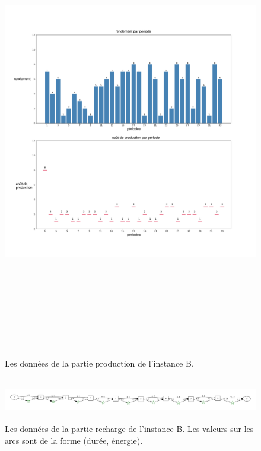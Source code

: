 	\begin{figure}[H]
	\centerline{%
		\includegraphics[height=20cm]{images_these/DPS_inputU_24.pdf}}
	\caption[Les données de la partie production de l'instance B]{Les données de la partie production de l'instance B.}
	\label{Inst_1}
\end{figure}
	\begin{figure}[H]
	\centerline{%
		\includegraphics[height=1.9cm]{images_these/DPS_inputS_24.pdf}}
	\caption[Les données de la partie recharge de l'instance B]{Les données de la partie recharge de l'instance B. Les valeurs sur les arcs sont de la forme (durée, énergie).}
	\label{tourInst_1}
	\end{figure}
